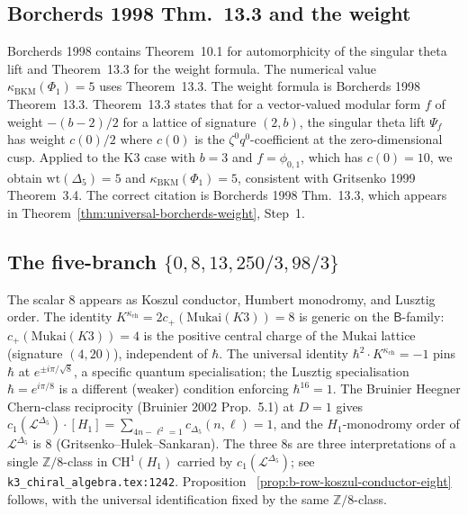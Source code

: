 \documentclass[11pt]{article}
\newcommand{\Z}{\mathbb{Z}}
\newcommand{\cL}{\mathcal{L}}
\newcommand{\wt}{\mathrm{wt}}
\newcommand{\Mukai}{\mathrm{Mukai}}
\begin{document}
\subsection*{Borcherds 1998 Thm.~13.3 and the weight}
Borcherds 1998 contains Theorem~10.1 for automorphicity of the singular
theta lift and Theorem~13.3 for the weight formula. The numerical value
$\kappa_{\mathrm{BKM}}(\Phi_1)=5$ uses Theorem~13.3. The weight formula is Borcherds 1998
Theorem~13.3. Theorem~13.3 states that for a vector-valued modular
form $f$ of weight $-(b-2)/2$ for a lattice of signature $(2,b)$, the
singular theta lift $\Psi_f$ has weight $c(0)/2$ where $c(0)$ is the
$\zeta^0 q^0$-coefficient at the zero-dimensional cusp. Applied to
the K3 case with $b=3$ and $f=\phi_{0,1}$, which has
$c(0)=10$, we obtain $\wt(\Delta_5)=5$ and
$\kappa_{\mathrm{BKM}}(\Phi_1)=5$, consistent with
Gritsenko 1999 Theorem~3.4. The correct
citation is Borcherds 1998 Thm.~13.3, which appears in
Theorem~\ref{thm:universal-borcherds-weight}, Step~1.

\subsection*{The five-branch $\{0,8,13,250/3,98/3\}$}
The scalar $8$ appears as Koszul conductor, Humbert monodromy, and
Lusztig order. The identity $K^{\kappa_{\mathrm{ch}}}=
2c_+(\Mukai(K3))=8$ is generic on the $\mathsf{B}$-family:
$c_+(\Mukai(K3))=4$ is the positive central charge of the
Mukai lattice (signature $(4,20)$), independent of $\hbar$. The
universal identity $\hbar^2\cdot K^{\kappa_{\mathrm{ch}}}=-1$
pins $\hbar$ at $e^{\pm i\pi/\sqrt 8}$, a specific quantum
specialisation; the Lusztig specialisation
$\hbar=e^{i\pi/8}$ is a different (weaker) condition enforcing
$\hbar^{16}=1$. The Bruinier Heegner Chern-class reciprocity
(Bruinier 2002 Prop.~5.1) at $D=1$ gives
$c_1(\cL^{\Delta_5})\cdot[H_1]=\sum_{4n-\ell^2=1}c_{\Delta_5}(n,\ell)=
1$, and the $H_1$-monodromy order of $\cL^{\Delta_5}$ is $8$
(Gritsenko--Hulek--Sankaran). The three $8$s are three
interpretations of a single $\Z/8$-class in
$\mathrm{CH}^1(H_1)$ carried by $c_1(\cL^{\Delta_5})$; see
\texttt{k3\_chiral\_algebra.tex:1242}. Proposition~
\ref{prop:b-row-koszul-conductor-eight} follows, with the universal
identification fixed by the same $\Z/8$-class.
\end{document}
